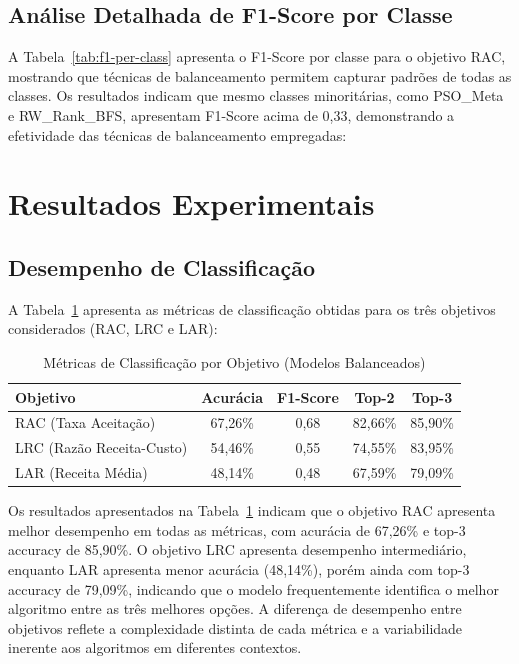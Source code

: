 \documentclass[conference]{IEEEtran}
\begin{document}
\subsection{Análise Detalhada de F1-Score por Classe}

A Tabela~\ref{tab:f1-per-class} apresenta o F1-Score por classe para o objetivo RAC, mostrando que técnicas de balanceamento permitem capturar padrões de todas as classes. Os resultados indicam que mesmo classes minoritárias, como PSO\_Meta e RW\_Rank\_BFS, apresentam F1-Score acima de 0,33, demonstrando a efetividade das técnicas de balanceamento empregadas:

\section{Resultados Experimentais}
\label{sec:Results}

\subsection{Desempenho de Classificação}

A Tabela~\ref{tab:classification-metrics} apresenta as métricas de classificação obtidas para os três objetivos considerados (RAC, LRC e LAR):

\begin{table}[H]
\centering
\caption{Métricas de Classificação por Objetivo (Modelos Balanceados)}
\label{tab:classification-metrics}
\begin{tabular}{lcccc}
\toprule
\textbf{Objetivo} & \textbf{Acurácia} & \textbf{F1-Score} & \textbf{Top-2} & \textbf{Top-3} \\
\midrule
RAC (Taxa Aceitação) & 67,26\% & 0,68 & 82,66\% & 85,90\% \\
LRC (Razão Receita-Custo) & 54,46\% & 0,55 & 74,55\% & 83,95\% \\
LAR (Receita Média) & 48,14\% & 0,48 & 67,59\% & 79,09\% \\
\bottomrule
\end{tabular}
\end{table}

Os resultados apresentados na Tabela~\ref{tab:classification-metrics} indicam que o objetivo RAC apresenta melhor desempenho em todas as métricas, com acurácia de 67,26\% e top-3 accuracy de 85,90\%. O objetivo LRC apresenta desempenho intermediário, enquanto LAR apresenta menor acurácia (48,14\%), porém ainda com top-3 accuracy de 79,09\%, indicando que o modelo frequentemente identifica o melhor algoritmo entre as três melhores opções. A diferença de desempenho entre objetivos reflete a complexidade distinta de cada métrica e a variabilidade inerente aos algoritmos em diferentes contextos.
\end{document}
